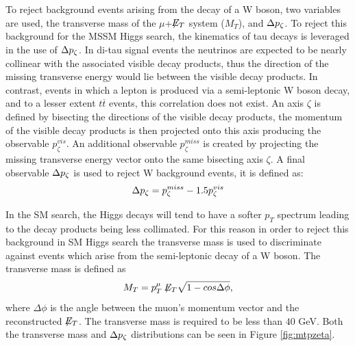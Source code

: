To reject background events arising from the decay of a W boson, two variables are used, the transverse mass of the $\mu$+$\not\!\!{E}_{T}$ system ($M_{T}$), and $\Delta p_{\zeta}$.
To reject this background for the MSSM Higgs search, the kinematics of tau decays is leveraged in the use of $\Delta p_{\zeta}$.
In di-tau signal events the neutrinos are expected to be nearly collinear with the associated visible decay products, thus the direction of the missing transverse energy would lie between the visible decay products.
In contrast, events in which a lepton is produced via a semi-leptonic W boson decay, and to a lesser extent $t\overline{t}$ events, this correlation does not exist.
An axis $\zeta$ is defined by bisecting the directions of the visible decay products, the momentum of the visible decay products is then projected onto this axis producing the observable $p_{\zeta}^{vis}$.
An additional observable $p_{\zeta}^{miss}$ is created by projecting the missing transverse energy vector onto the same bisecting axis $\zeta$.
A final observable $\Delta p_{\zeta}$ is used to reject W background events, it is defined as:
\begin{equation}
\label{eqn:pzetadiff}
\Delta p_{\zeta} = p_{\zeta}^{miss} -  1.5 p_{\zeta}^{vis}
\end{equation}

In the SM search, the Higgs decays will tend to have a softer $p_{T}$ spectrum leading to the decay products being less collimated.
For this reason in order to reject this background in SM Higgs search the transverse mass is used to discriminate against events which arise from the semi-leptonic decay of a W boson.
The transverse mass is defined as 
\begin{equation}
\label{eqn:mt}
   M_{T} = p_{T}^{\mu}\not\!\!{E}_{T}\sqrt{1-cos\Delta\phi},
\end{equation}
where $\Delta\phi$ is the angle between the muon's momentum vector and the reconstructed $\not\!\!{E}_{T}$.
The transverse mass is required to be less than $40$ GeV.
Both the transverse mass and $\Delta p_{\zeta}$ distributions can be seen in Figure \ref{fig:mtpzeta}.


